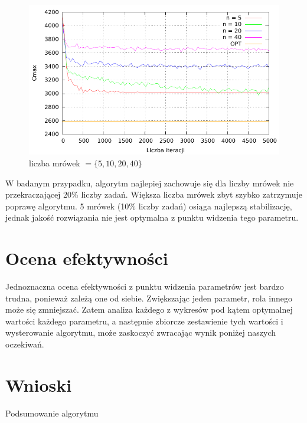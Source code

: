 \documentclass[10pt,a4paper]{article}
\begin{document}
\begin{figure}[h]
    \centering
    \includegraphics{./figures/inst_01_rnd_antno_smooth.pdf}
    \caption{liczba mrówek $= \{ 5, 10, 20, 40 \} $}
\end{figure}
\vspace{15mm}
W badanym przypadku, algorytm najlepiej zachowuje się dla liczby mrówek nie przekraczającej 20\% liczby zadań.
Większa liczba mrówek zbyt szybko zatrzymuje poprawę algorytmu. 5 mrówek (10\% liczby zadań) osiąga najlepszą stabilizację, jednak jakość rozwiązania nie jest optymalna z punktu widzenia tego parametru.

\newpage
\section{Ocena efektywności}
Jednoznaczna ocena efektywności z punktu widzenia parametrów jest bardzo trudna, ponieważ zależą one od siebie.
Zwiększając jeden parametr, rola innego może się zmniejszać. Zatem analiza każdego z wykresów pod kątem optymalnej wartości każdego parametru, a następnie zbiorcze zestawienie tych wartości i wysterowanie algorytmu, może zaskoczyć zwracając wynik poniżej naszych oczekiwań.

\section{Wnioski}
Podsumowanie algorytmu
\end{document}
